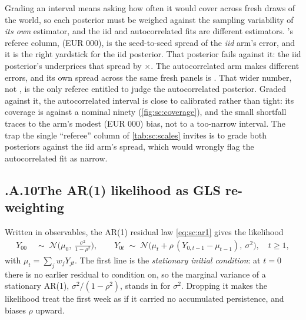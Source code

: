 Grading an interval means asking how often it would cover across fresh draws of the world, so each
posterior must be weighed against the sampling variability of \emph{its own} estimator, and the
iid and autocorrelated fits are different estimators. 's referee column,
\keur{\nbSevenSeedSd} (EUR 000), is the seed-to-seed spread of the \emph{iid} arm's error, and it is
the right yardstick for the iid posterior. That posterior fails against it: the iid posterior's
\keur{\nbSevenIidSd} underprices that spread by \nbSevenUnderprice$\times$. The autocorrelated arm makes different errors, and its
own spread across the same \nbSevenNPanels{} fresh panels is \keur{\nbSevenSeedSdArone}. That wider
number, not \keur{\nbSevenSeedSd}, is the only referee entitled to judge the autocorrelated
posterior. Graded against it, the autocorrelated interval is close to calibrated rather than tight:
its coverage is \pc{\nbSevenTotalCovArone} against a nominal ninety (\cref{fig:sc:coverage}), and
the small shortfall traces
to the arm's modest \nbSevenBiasArone{} (EUR 000) bias, not to a too-narrow interval. The trap the
single ``referee'' column of \cref{tab:sc:scales} invites is to grade both posteriors against the
iid arm's spread, which would wrongly flag the autocorrelated fit as narrow.

\subsection*{\thechapter.A.10\quad The AR(1) likelihood as GLS re-weighting}
\label{app:sc:ar1}

Written in observables, the AR(1) residual law \cref{eq:sc:ar1} gives the likelihood
%
\begin{align}
  Y_{00} &\;\sim\; \mathcal N\!\Big(\mu_0,\ \tfrac{\sigma^{2}}{1 - \rho^{2}}\Big),
        \qquad
  Y_{0t} \;\sim\; \mathcal N\!\big(\mu_t + \rho\,(Y_{0,t-1} - \mu_{t-1}),\ \sigma^{2}\big),
        \quad t \ge 1, \label{eq:sc:ar1lik}
\end{align}
%
with $\mu_t = \sum_j w_j Y_{jt}$. The first line is the \emph{stationary initial condition}: at
$t = 0$ there is no earlier residual to condition on, so the marginal variance of a stationary
AR(1), $\sigma^{2}/(1-\rho^{2})$, stands in for $\sigma^{2}$. Dropping it makes the likelihood treat
the first week as if it carried no accumulated persistence, and biases $\rho$ upward.

